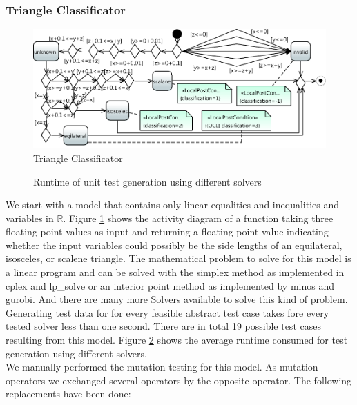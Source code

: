 \subsubsection{Triangle Classificator}
\begin{figure}
\includegraphics[width=\textwidth]{./pics/TriangleLIN.pdf}
\caption{Triangle Classificator}
\label{fig:TriangleLin}
\end{figure}
\begin{figure}
\caption{Runtime of unit test generation using different solvers}
\label{fig:TriangleLinRuntime}
\end{figure}
We start with a model that contains only linear equalities and inequalities and variables in $\mathbb{R}$. Figure \ref{fig:TriangleLin} shows the activity diagram of a function taking three floating point values as input and returning a floating point value indicating whether the input variables could possibly be the side lengths of an equilateral, isosceles, or scalene triangle. The mathematical problem to solve for this model is a linear program and can be solved with the simplex method as implemented in cplex and lp\_solve or an interior point method as implemented by minos and gurobi. And there are many more Solvers available to solve this kind of problem. Generating test data for for every feasible abstract test case takes fore every tested solver less than one second. There are in total 19 possible test cases resulting from this model. Figure \ref{fig:TriangleLinRuntime} shows the average runtime consumed for test generation using different solvers.\\
We manually performed the mutation testing for this model. As mutation operators we exchanged several operators by the opposite operator. The following replacements have been done:

